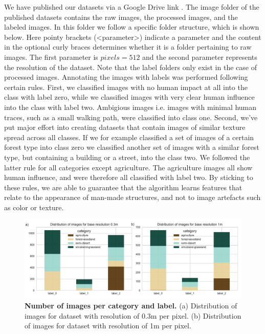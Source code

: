We have published our datasets via a Google Drive link \parencite{datasets}. The image folder of the published datasets contains the raw images, the processed images, and the labeled images. In this folder we follow a specific folder structure, which is shown below. Here pointy brackets (<parameter>) indicate a parameter and the content in the optional curly braces determines whether it is a folder pertaining to raw images. The first parameter is $pixels = 512$ and the second parameter represents the resolution of the dataset. Note that the label folders only exist in the case of processed images.
\vspace{10px}
\vspace{10px}
Annotating the images with labels was performed following certain rules. First, we classified images with no human impact at all into the class with label zero,  while we classified images with very clear human influence into the class with label two. Ambigious images i.e. images with minimal human traces, such as a small walking path, were classified into class one. Second, we've put major effort into creating datasets that contain images of similar texture spread across all classes. If we for example classified a set of images of a certain forest type into class zero we classified another set of images with a similar forest type, but containing a building or a street, into the class two. We followed the latter rule for all categories except agriculture. The agriculture images all show human influence, and were therefore all classified with label two. By sticking to these rules, we are able to guarantee that the algorithm learns features that relate to the appearance of man-made structures, and not to image artefacts such as color or texture.

\begin{figure}[h!]
	\centering
	\captionsetup{width=1\linewidth}
	\includegraphics[width=1\textwidth]{Figures/imstats.pdf}
	\caption{\textbf{Number of images per category and label.} (a) Distribution of images for dataset with resolution of 0.3m per pixel. (b) Distribution of images for dataset with resolution of 1m per pixel.}
	\label{fig:imstats}
\end{figure}

